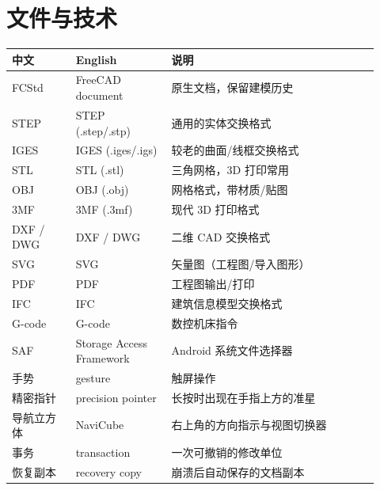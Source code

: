 \section{文件与技术}

\begin{longtable}{@{}p{0.16\linewidth}p{0.24\linewidth}p{0.52\linewidth}@{}}
\toprule \textbf{中文} & \textbf{English} & \textbf{说明} \\ \midrule \endhead
FCStd & FreeCAD document & 原生文档，保留建模历史 \\
STEP & STEP (.step/.stp) & 通用的实体交换格式 \\
IGES & IGES (.iges/.igs) & 较老的曲面/线框交换格式 \\
STL & STL (.stl) & 三角网格，3D 打印常用 \\
OBJ & OBJ (.obj) & 网格格式，带材质/贴图 \\
3MF & 3MF (.3mf) & 现代 3D 打印格式 \\
DXF / DWG & DXF / DWG & 二维 CAD 交换格式 \\
SVG & SVG & 矢量图（工程图/导入图形）\\
PDF & PDF & 工程图输出/打印 \\
IFC & IFC & 建筑信息模型交换格式 \\
G-code & G-code & 数控机床指令 \\
SAF & Storage Access Framework & Android 系统文件选择器 \\
手势 & gesture & 触屏操作 \\
精密指针 & precision pointer & 长按时出现在手指上方的准星 \\
导航立方体 & NaviCube & 右上角的方向指示与视图切换器 \\
事务 & transaction & 一次可撤销的修改单位 \\
恢复副本 & recovery copy & 崩溃后自动保存的文档副本 \\
\bottomrule
\end{longtable}
